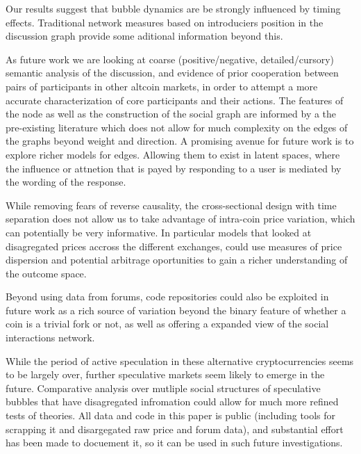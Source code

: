 Our results suggest that bubble dynamics are be strongly influenced by timing effects. Traditional network measures based on introduciers position in the discussion graph provide some aditional  information beyond this.

As future work we are looking at coarse (positive/negative, detailed/cursory) semantic analysis of the discussion, and evidence of prior cooperation between pairs of participants in other altcoin markets, in order to attempt a more accurate characterization of core participants and their actions.
The features of the node as well as the construction of the social graph are informed by a the pre-existing literature which does not allow for much complexity on the edges of the graphs beyond weight and direction.
A promising avenue for future work is to explore richer models for edges. Allowing them to exist in latent spaces, where the influence or attnetion that is payed by responding to a user is mediated by the wording of the response. 

While removing fears of reverse causality, the cross-sectional design with time separation does not allow us to take advantage of intra-coin price variation, which can potentially be very informative.
In particular models that looked at disagregated prices accross the different exchanges, could use measures of price dispersion and potential arbitrage oportunities to gain a richer understanding of the outcome space.

Beyond using data from forums, code repositories could also be exploited in future work as a rich source of variation beyond the binary feature of whether a coin is a trivial fork or not, as well as offering a expanded view of the social interactions network.


While the period of active speculation in these alternative cryptocurrencies seems to be largely over, further speculative markets seem likely to emerge in the future. Comparative analysis over mutliple social structures of speculative bubbles that have disagregated infromation could allow for much more refined tests of theories. 
All data and code in this paper is public (including tools for scrapping it and disargegated raw price and forum data), and substantial effort has been made to docuement it, so it can be used in such future investigations. 
